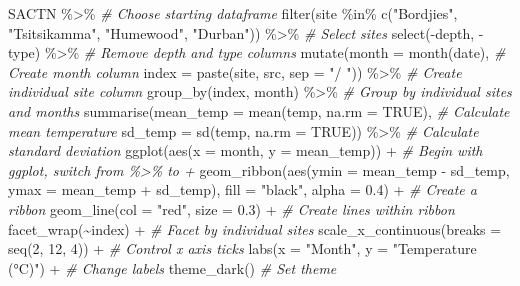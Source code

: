 \documentclass[
]{book}
\newenvironment{Shaded}{\begin{snugshade}}{\end{snugshade}}
\newcommand{\AttributeTok}[1]{\textcolor[rgb]{0.77,0.63,0.00}{#1}}
\newcommand{\CommentTok}[1]{\textcolor[rgb]{0.56,0.35,0.01}{\textit{#1}}}
\newcommand{\ConstantTok}[1]{\textcolor[rgb]{0.00,0.00,0.00}{#1}}
\newcommand{\DecValTok}[1]{\textcolor[rgb]{0.00,0.00,0.81}{#1}}
\newcommand{\FloatTok}[1]{\textcolor[rgb]{0.00,0.00,0.81}{#1}}
\newcommand{\FunctionTok}[1]{\textcolor[rgb]{0.00,0.00,0.00}{#1}}
\newcommand{\NormalTok}[1]{#1}
\newcommand{\SpecialCharTok}[1]{\textcolor[rgb]{0.00,0.00,0.00}{#1}}
\newcommand{\StringTok}[1]{\textcolor[rgb]{0.31,0.60,0.02}{#1}}
\begin{document}
\begin{Shaded}
\begin{Highlighting}[]
\NormalTok{SACTN }\SpecialCharTok{\%\textgreater{}\%} \CommentTok{\# Choose starting dataframe}
  \FunctionTok{filter}\NormalTok{(site }\SpecialCharTok{\%in\%} \FunctionTok{c}\NormalTok{(}\StringTok{"Bordjies"}\NormalTok{, }\StringTok{"Tsitsikamma"}\NormalTok{, }\StringTok{"Humewood"}\NormalTok{, }\StringTok{"Durban"}\NormalTok{)) }\SpecialCharTok{\%\textgreater{}\%} \CommentTok{\# Select sites}
  \FunctionTok{select}\NormalTok{(}\SpecialCharTok{{-}}\NormalTok{depth, }\SpecialCharTok{{-}}\NormalTok{type) }\SpecialCharTok{\%\textgreater{}\%} \CommentTok{\# Remove depth and type columns}
  \FunctionTok{mutate}\NormalTok{(}\AttributeTok{month =} \FunctionTok{month}\NormalTok{(date), }\CommentTok{\# Create month column}
         \AttributeTok{index =} \FunctionTok{paste}\NormalTok{(site, src, }\AttributeTok{sep =} \StringTok{"/ "}\NormalTok{)) }\SpecialCharTok{\%\textgreater{}\%} \CommentTok{\# Create individual site column}
  \FunctionTok{group\_by}\NormalTok{(index, month) }\SpecialCharTok{\%\textgreater{}\%} \CommentTok{\# Group by individual sites and months}
  \FunctionTok{summarise}\NormalTok{(}\AttributeTok{mean\_temp =} \FunctionTok{mean}\NormalTok{(temp, }\AttributeTok{na.rm =} \ConstantTok{TRUE}\NormalTok{), }\CommentTok{\# Calculate mean temperature}
            \AttributeTok{sd\_temp =} \FunctionTok{sd}\NormalTok{(temp, }\AttributeTok{na.rm =} \ConstantTok{TRUE}\NormalTok{)) }\SpecialCharTok{\%\textgreater{}\%} \CommentTok{\# Calculate standard deviation}
  \FunctionTok{ggplot}\NormalTok{(}\FunctionTok{aes}\NormalTok{(}\AttributeTok{x =}\NormalTok{ month, }\AttributeTok{y =}\NormalTok{ mean\_temp)) }\SpecialCharTok{+} \CommentTok{\# Begin with ggplot, switch from \textquotesingle{}\%\textgreater{}\%\textquotesingle{} to \textquotesingle{}+\textquotesingle{}}
  \FunctionTok{geom\_ribbon}\NormalTok{(}\FunctionTok{aes}\NormalTok{(}\AttributeTok{ymin =}\NormalTok{ mean\_temp }\SpecialCharTok{{-}}\NormalTok{ sd\_temp, }\AttributeTok{ymax =}\NormalTok{ mean\_temp }\SpecialCharTok{+}\NormalTok{ sd\_temp), }
              \AttributeTok{fill =} \StringTok{"black"}\NormalTok{, }\AttributeTok{alpha =} \FloatTok{0.4}\NormalTok{) }\SpecialCharTok{+} \CommentTok{\# Create a ribbon}
  \FunctionTok{geom\_line}\NormalTok{(}\AttributeTok{col =} \StringTok{"red"}\NormalTok{, }\AttributeTok{size =} \FloatTok{0.3}\NormalTok{) }\SpecialCharTok{+} \CommentTok{\# Create lines within ribbon}
  \FunctionTok{facet\_wrap}\NormalTok{(}\SpecialCharTok{\textasciitilde{}}\NormalTok{index) }\SpecialCharTok{+} \CommentTok{\# Facet by individual sites}
  \FunctionTok{scale\_x\_continuous}\NormalTok{(}\AttributeTok{breaks =} \FunctionTok{seq}\NormalTok{(}\DecValTok{2}\NormalTok{, }\DecValTok{12}\NormalTok{, }\DecValTok{4}\NormalTok{)) }\SpecialCharTok{+} \CommentTok{\# Control x axis ticks}
  \FunctionTok{labs}\NormalTok{(}\AttributeTok{x =} \StringTok{"Month"}\NormalTok{, }\AttributeTok{y =} \StringTok{"Temperature (°C)"}\NormalTok{) }\SpecialCharTok{+} \CommentTok{\# Change labels}
  \FunctionTok{theme\_dark}\NormalTok{() }\CommentTok{\# Set theme}
\end{Highlighting}
\end{Shaded}
\end{document}

